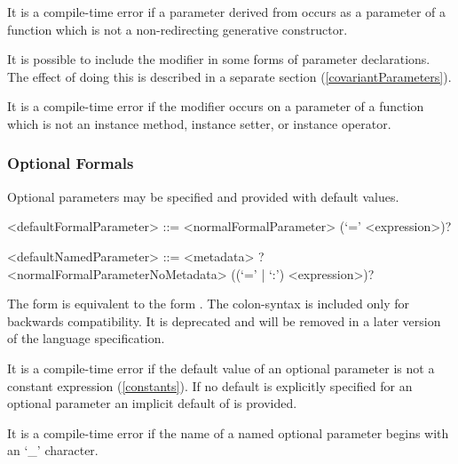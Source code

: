\documentclass[makeidx]{article}
\begin{document}
\LMHash{}%
It is a compile-time error if a parameter derived from
 occurs as a parameter of a function
which is not a non-redirecting generative constructor.


\LMHash{}%
It is possible to include the modifier \COVARIANT{}
in some forms of parameter declarations.
The effect of doing this is described in a separate section
(\ref{covariantParameters}).


\LMHash{}%
It is a compile-time error if the modifier \COVARIANT{} occurs on
a parameter of a function which is not
an instance method, instance setter, or instance operator.


\subsubsection{Optional Formals}

\LMHash{}%
Optional parameters may be specified and provided with default values.

\begin{grammar}
<defaultFormalParameter> ::= <normalFormalParameter> (`=' <expression>)?

<defaultNamedParameter> ::= \gnewline{}
  <metadata> \REQUIRED? <normalFormalParameterNoMetadata>
  \gnewline{} ((`=' | `:') <expression>)?
\end{grammar}

The form 
is equivalent to the form
.
The colon-syntax is included only for backwards compatibility.
It is deprecated and will be removed in
a later version of the language specification.

\LMHash{}%
It is a compile-time error if the default value of an optional parameter is
not a constant expression (\ref{constants}).
If no default is explicitly specified for an optional parameter
an implicit default of \NULL{} is provided.

\LMHash{}%
It is a compile-time error if the name of a named optional parameter
begins with an `_' character.
\end{document}
